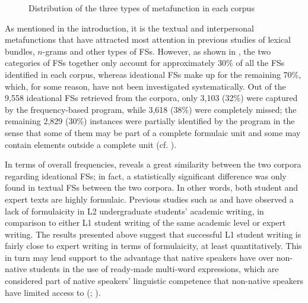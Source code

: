 \documentclass[output=paper]{langscibook}
\begin{document}
\begin{figure}
\caption{Distribution of the three types of metafunction in each corpus\label{fig:wang:1}}
\end{figure}

As mentioned in the introduction, it is the textual and interpersonal metafunctions that have attracted most attention in previous studies of lexical bundles, $n$-grams and other types of FSs. However, as shown in , the two categories of FSs together only account for approximately 30\% of all the FSs identified in each corpus, whereas ideational FSs make up for the remaining 70\%, which, for some reason, have not been investigated systematically. Out of the 9,558 ideational FSs retrieved from the corpora, only 3,103 (32\%) were captured by the frequency-based program, while 3,618 (38\%) were completely missed; the remaining 2,829 (30\%) instances were partially identified by the program in the sense that some of them may be part of a complete formulaic unit and some may contain elements outside a complete unit (cf. ). 

In terms of overall frequencies,  reveals a great similarity between the two corpora regarding ideational FSs; in fact, a statistically significant difference was only found in textual FSs between the two corpora. In other words, both student and expert texts are highly formulaic. Previous studies such as \citet{ChenBaker2010} and \citet{ÄdelErman2012} have observed a lack of formulaicity in L2 undergraduate students’ academic writing, in comparison to either L1 student writing of the same academic level or expert writing. The results presented above suggest that successful L1 student writing is fairly close to expert writing in terms of formulaicity, at least quantitatively. This in turn may lend support to the advantage that native speakers have over non-native students in the use of ready-made multi-word expressions, which are considered part of native speakers’ linguistic competence that non-native speakers have limited access to (\citealt{Wray2002,Wray2008}; \citealt{Kecskes2016}).  
\end{document}
